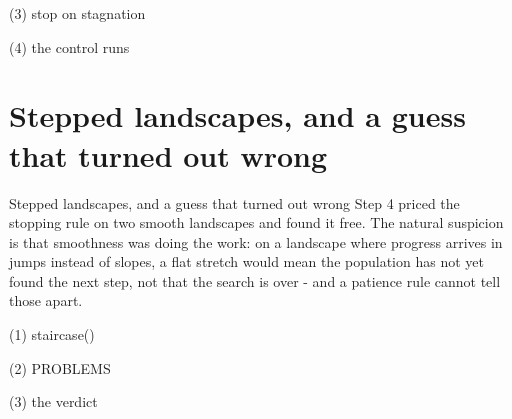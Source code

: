 \begin{frame}[fragile]{(3) stop on stagnation}

\end{frame}

\begin{frame}[fragile]{(4) the control runs}

\end{frame}


\section{Stepped landscapes, and a guess that turned out wrong}

\begin{frame}{Stepped landscapes, and a guess that turned out wrong}
Step 4 priced the stopping rule on two smooth landscapes and found it free. The
natural suspicion is that smoothness was doing the work: on a landscape where
progress arrives in jumps instead of slopes, a flat stretch would mean the
population has not yet found the next step, not that the search is over - and a
patience rule cannot tell those apart.
\end{frame}

\begin{frame}[fragile]{(1) staircase()}

\end{frame}

\begin{frame}[fragile]{(2) PROBLEMS}

\end{frame}

\begin{frame}[fragile]{(3) the verdict}

\end{frame}

